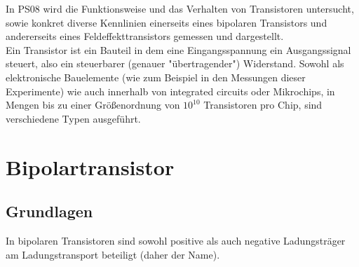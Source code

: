 \documentclass[12pt,a4paper]{article}
\begin{document}
\begin{multicols}{2}




%			


\noindent In PS08 wird die Funktionsweise und das Verhalten von Transistoren untersucht, sowie konkret diverse Kennlinien einerseits eines bipolaren Transistors und andererseits eines Feldeffekttransistors gemessen und dargestellt.\\

Ein Transistor ist ein Bauteil in dem eine Eingangsspannung ein Ausgangssignal steuert, also ein steuerbarer (genauer "übertragender") Widerstand. Sowohl als elektronische Bauelemente (wie zum Beispiel in den Messungen dieser Experimente) wie auch innerhalb von integrated circuits oder Mikrochips, in Mengen bis zu einer Größenordnung von $10^{10}$ Transistoren pro Chip, sind verschiedene Typen ausgeführt.\\



\section{Bipolartransistor}
\subsection{Grundlagen}
In bipolaren Transistoren sind sowohl positive als auch negative Ladungsträger am Ladungstransport beteiligt (daher der Name).\\


\end{multicols}
\end{document}
